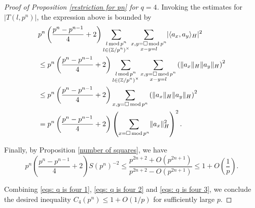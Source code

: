 \documentclass[11pt]{amsart}
\theoremstyle{plain} %
\theoremstyle{remark}
\numberwithin{equation}{section}
\newcommand{\Z}{\mathbb{Z}}
\DeclarePairedDelimiter\abs{\lvert}{\rvert}
\DeclarePairedDelimiter\norm{\lVert}{\rVert}
\newcommand{\sqp}[1]{\sum_{#1=\square\,\mathrm{mod}\,p^n}}
\begin{document}
\begin{proof}[Proof of Proposition \ref{restriction for pn} for $q=4$]
    Invoking the estimates for $|T(l,p^n)|$, the expression above is bounded by
    \begin{equation}\label{eqs: q is four 2}
        \begin{split}
            &p^n \left(\frac{p^n-p^{n-1}}{4}+2\right)\sum_{\substack{l\,\mathrm{mod}\,p^n\\l\in (\Z/p^n)^{\times}}} \sum_{\substack{x,y=\square\,\mathrm{mod}\,p^n\\x-y=l}} \abs{\langle a_x,a_y \rangle_H}^2\\
            &\leq p^n \left(\frac{p^n-p^{n-1}}{4}+2\right)\sum_{\substack{l\,\mathrm{mod}\,p^n\\l\in (\Z/p^n)^{\times}}} \sum_{\substack{x,y=\square\,\mathrm{mod}\,p^n\\x-y=l}} \left(\norm{a_x}_H\norm{a_y}_H\right)^2\\
            &\leq p^n \left(\frac{p^n-p^{n-1}}{4}+2\right)\sqp{x,y} \left(\norm{a_x}_H\norm{a_y}_H\right)^2\\
            &= p^n \left(\frac{p^n-p^{n-1}}{4}+2\right)\left(\sqp{x} \norm{a_x}_H^2\right)^2.
        \end{split}
    \end{equation}

    Finally, by Proposition \ref{number of squares}, we have
    \begin{equation}\label{eqs: q is four 3}
        p^n \left(\frac{p^n-p^{n-1}}{4}+2\right)S(p^n)^{-2}\leq \frac{p^{2n+2}+O(p^{2n+1})}{p^{2n+2}-O(p^{2n+1})}\leq 1+O\left(\frac{1}{p}\right).
    \end{equation}

    Combining \eqref{eqs: q is four 1}, \eqref{eqs: q is four 2} and \eqref{eqs: q is four 3}, we conclude the desired inequality $C_4(p^n)\leq 1+O(1/p)$ for sufficiently large $p$.
\end{proof}
\end{document}
